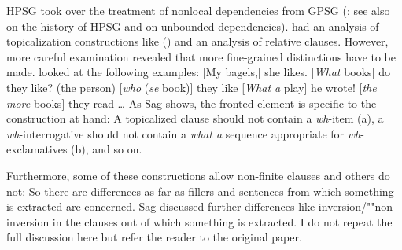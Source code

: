 \documentclass[output=paper,biblatex,babelshorthands,newtxmath,draftmode,colorlinks,citecolor=brown]{langscibook}
\begin{document}
HPSG took over the treatment of nonlocal dependencies from GPSG (\citealt{Gazdar81a}; see also
 on the history of HPSG and  on
unbounded dependencies). \citet[Chapters~4 and~5]{ps2} had
an analysis of topicalization constructions like () and an analysis of relative
clauses. However, more careful examination revealed that more fine-grained distinctions have to be
made. \citet[]{Sag2010b} looked at the following examples:
\settowidth{}
\eal
\ex {}[My bagels,] she likes.                           
\ex {}[\emph{What} books] do they like?                 
\ex (the person) [\emph{who} (\emph{se} book)] they like 
\ex {}[\emph{What a} play] he wrote!                    
\ex {}[\emph{the more} books] they read \ldots          {}
\zl
As Sag shows, the fronted element is specific to the construction at hand:
\eal
{}
\zl
\noindent
A topicalized clause should not contain a \emph{wh}-item (a), a \emph{wh}-interrogative should not
contain a \emph{what a} sequence appropriate for \emph{wh}-exclamatives (b), and so on.

Furthermore, some of these constructions allow non-finite clauses and others do not:
\eal
{}
\zl
So there are differences as far as fillers and sentences from which something is extracted
are concerned. Sag discussed further differences like inversion/""non-inversion in the clauses out of
which something is extracted. I do not repeat the full discussion here but refer the reader to the
original paper.
\end{document}
